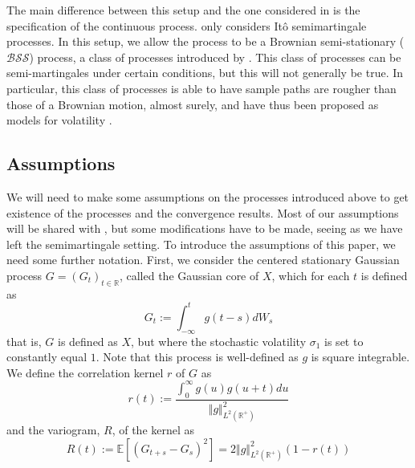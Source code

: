 \documentclass[fleqn,11pt,letterpaper]{article}
\theoremstyle{plain}
\theoremstyle{definition}
\theoremstyle{remark}
\numberwithin{equation}{section}
\begin{document}


The main difference between this setup and the one considered in \cite{Todorov2010} is the specification of the continuous process. \cite{Todorov2010} only considers Itô semimartingale processes. In this setup, we allow the process to be a Brownian semi-stationary ($\mathcal{BSS}$) process, a class of processes introduced by \cite{ole-jurgen09}. This class of processes can be semi-martingales under certain conditions, but this will not generally be true. In particular, this class of processes is able to have sample paths are rougher than those  of a Brownian motion, almost surely, and have thus been proposed as models for volatility \citep{Bennedsen2021}. 

\subsection{Assumptions}\label{subsec:assumptions}

We will need to make some assumptions on the processes introduced above to get existence of the processes and the convergence results. Most of our assumptions will be shared with \cite{Todorov2010}, but some modifications have to be made, seeing as we have left the semimartingale setting. To introduce the assumptions of this paper, we need some further notation. First, we consider the centered stationary Gaussian process $G=(G_t)_{t\in\mathbb{R}}$, called the Gaussian core of $X$, which for each $t$ is defined as 
\begin{equation}
    G_t:=\int_{-\infty}^tg(t-s)dW_s
\end{equation}
that is, $G$ is defined as $X$, but where the stochastic volatility $\sigma_{1}$ is set to constantly equal $1$. Note that this process is well-defined as $g$ is square integrable. We define the correlation kernel $r$ of $G$ as 
\begin{equation}
    r(t):=\frac{\int_0^\infty g(u)g(u+t)du}{\Vert g\Vert^2_{L^2(\mathbb{R}^+)}}
\end{equation}
and the variogram, $R$, of the kernel as 
\begin{equation}
    R(t):=\mathbb{E}[(G_{t+s}-G_s)^2]=2\Vert g\Vert^2_{L^2(\mathbb{R}^+)}(1-r(t))
\end{equation}
\end{document}
